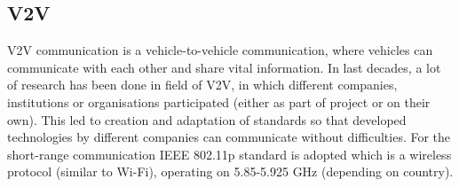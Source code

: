 \subsection{V2V}

V2V communication is a vehicle-to-vehicle communication, where vehicles can communicate with each other and share vital information. In last decades, a lot of research has been done in field of V2V, in which different companies, institutions or organisations participated (either as part of project or on their own). This led to creation and adaptation of standards so that developed technologies by different companies can communicate without difficulties. For the short-range communication IEEE 802.11p standard is adopted which is a wireless protocol (similar to Wi-Fi), operating on 5.85-5.925 GHz (depending on country).









